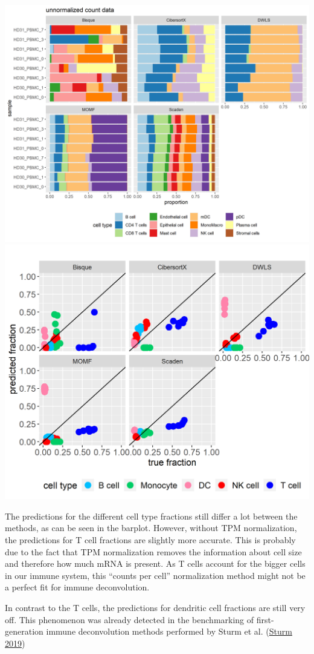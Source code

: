 \documentclass[
]{article}
\begin{document}
\includegraphics[width=0.8\linewidth]{images/propgrid_counts}
\includegraphics[width=0.8\linewidth]{images/predictionVsGroundtruth_unnormalized}

The predictions for the different cell type fractions still differ a lot
between the methods, as can be seen in the barplot. However, without TPM
normalization, the predictions for T cell fractions are slightly more
accurate. This is probably due to the fact that TPM normalization
removes the information about cell size and therefore how much mRNA is
present. As T cells account for the bigger cells in our immune system,
this ``counts per cell'' normalization method might not be a perfect fit
for immune deconvolution.

In contrast to the T cells, the predictions for dendritic cell fractions
are still very off. This phenomenon was already detected in the
benchmarking of first-generation immune deconvolution methods performed
by Sturm et al. (\protect\hyperlink{ref-Sturm2019}{Sturm 2019})
\end{document}
